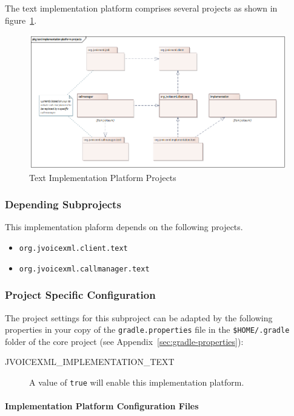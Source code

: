 \documentclass[11pt,a4paper]{article}
\begin{document}
The text implementation platform comprises several projects as shown in figure~\ref{fig:text-implementation-platform-projects}.
\begin{figure}
\includegraphics[width=\linewidth]{text-implementation-platform-projects.png}
\caption{Text Implementation Platform Projects}
\label{fig:text-implementation-platform-projects}
\end{figure}

\subsubsection{Depending Subprojects}

This implementation plaform depends on the following projects.
\begin{itemize}
\item \texttt{org.jvoicexml.client.text}
\item \texttt{org.jvoicexml.callmanager.text}
\end{itemize}

\subsubsection{Project Specific Configuration}

The project settings for this subproject can be adapted by the following 
properties in your copy of the \texttt{gradle.properties} file in the
\texttt{\${HOME}/.gradle} folder of the core project (see 
Appendix~\ref{sec:gradle-properties}):

\begin{description}
\item[JVOICEXML\_IMPLEMENTATION\_TEXT] A value of \texttt{true} will enable this implementation
platform.
\end{description}

\paragraph{Implementation Platform Configuration Files}
\end{document}
